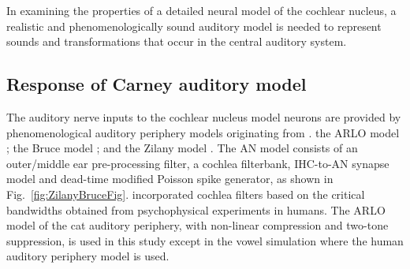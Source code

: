 



%

In examining the properties of a detailed neural model of the cochlear nucleus,
a realistic and phenomenologically sound auditory model is needed to represent
sounds and transformations that occur in the central auditory system.

%
\subsection{Response of Carney auditory model }

The auditory nerve inputs to the cochlear nucleus model neurons are provided by
phenomenological auditory periphery models originating from
\citet{Carney:1993}. the ARLO model \citep{HeinzZhangEtAl:2001}; the Bruce model
\citep{BruceSachsEtAl:2003, ZilanyBruce:2006, ZilanyBruce:2007}; and the Zilany
model \citep{ZilanyBruceEtAl:2009}. The AN model consists of an outer/middle ear
pre-processing filter, a cochlea filterbank, IHC-to-AN synapse model and
dead-time modified Poisson spike generator, as shown in
Fig.~\ref{fig:ZilanyBruceFig}. \citep{HeinzZhangEtAl:2001} incorporated cochlea
filters based on the critical bandwidths obtained from psycho\-physical
experiments in humans. The ARLO model of the cat auditory periphery, with
non-linear compression and two-tone suppression, is used in this study except in
the vowel simulation where the human auditory periphery model is used.



